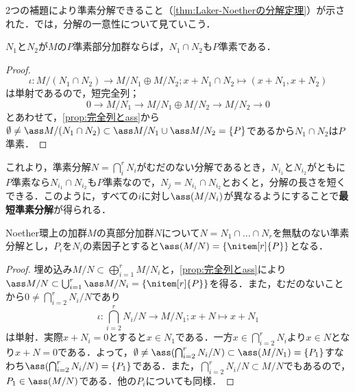 2つの補題により準素分解できること（\ref{thm:Laker-Noetherの分解定理}）が示された．では，分解の一意性について見ていこう．
\begin{lem}
	$N_1$と$N_2$が$M$の$ P$準素部分加群ならば，$N_1\cap N_2$も$ P$準素である．
\end{lem}
\begin{proof}
	\[\iota:M/(N_1\cap N_2)\longrightarrow M/N_1\oplus M/N_2;x+N_1\cap N_2\longmapsto(x+N_1,x+N_2)\]
	は単射であるので，短完全列；
	\[0\longrightarrow M/N_1\longrightarrow M/N_1\oplus M/N_2\longrightarrow M/N_2\longrightarrow0\]
	とあわせて，\ref{prop:完全列とass}から$\emptyset\neq\ass M/(N_1\cap N_2)\subset\ass M/N_1\cup\ass M/N_2=\{P\}$であるから$N_1\cap N_2$は$P$準素．
\end{proof}

これより，準素分解$N=\bigcap_i^r N_i$がむだのない分解であるとき，$N_{i_1}$と$N_{i_2}$がともに$ P$準素なら$N_{i_1}\cap N_{i_2}$も$ P$準素なので，$N_j=N_{i_1}\cap N_{i_2}$とおくと，分解の長さを短くできる．このように，すべての$i$に対し$\ass (M/N_i)$が異なるようにすることで\textbf{最短準素分解}が得られる．
\begin{thm}
	Noether環上の加群$M$の真部分加群$N$について$N=N_1\cap\dots\cap N_r$を無駄のない準素分解とし，$ P_i$を$N_i$の素因子とすると$\ass (M/N)=\{\nitem[r]{ P}\}$となる．
\end{thm}
\begin{proof}
	埋め込み$M/N\subset\bigoplus_{i=1}^rM/N_i$と，\ref{prop:完全列とass}により$\ass M/N\subset \bigcup_{i=1}^r\ass M/N_i=\{\nitem[r]{ P}\}$を得る．また，むだのないことから$0\neq\bigcap_{i=2}^r N_i/N$であり
	\[\iota:\bigcap_{i=2}^rN_i/N\longrightarrow M/N_1;x+N\longmapsto x+N_1\]
	は単射．実際$x+N_i=0$とすると$x\in N_1$である．一方$x\in\bigcap_{i=2}^r N_i$より$x\in N$となり$x+N=0$である．よって，$\emptyset\neq\ass(\bigcap_{i=2}^r N_i/N)\subset\ass (M/N_1)=\{ P_1\}$すなわち$\ass(\bigcap_{i=2}^r N_i/N)=\{ P_1\}$である．また，$\bigcap_{i=2}^r N_i/N\subset M/N$でもあるので，$ P_1\in\ass (M/N)$である．他の$ P_i$についても同様．
\end{proof}


